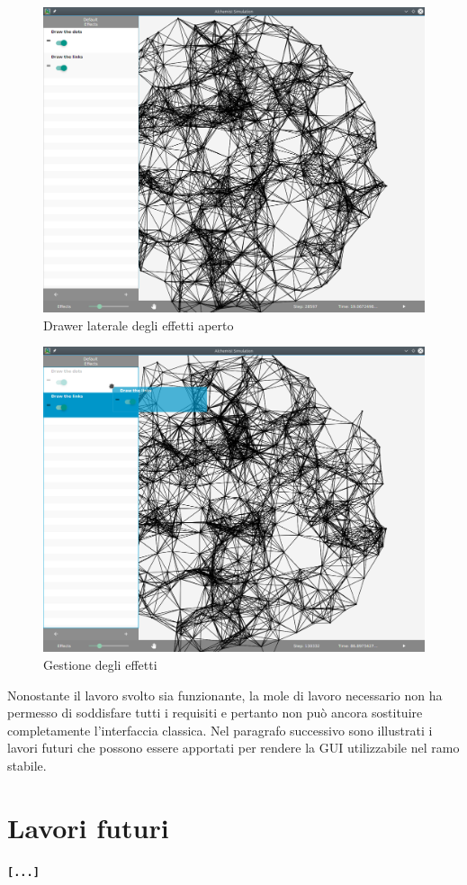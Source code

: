         \begin{figure}[htbp]
            \centering
            \includegraphics[scale=0.45]{img/withNodes/simWithEff}
            \caption{Drawer laterale degli effetti aperto}
            \label{fig:simWithEff}
        \end{figure}

        \begin{figure}[htbp]
            \centering
            \includegraphics[scale=0.45]{img/withNodes/simWithDnD}
            \caption{Gestione  degli effetti}
            \label{fig:simWithDnD}
        \end{figure}

        Nonostante il lavoro svolto sia funzionante, la mole di lavoro necessario non ha permesso di soddisfare tutti i requisiti e pertanto non può ancora sostituire completamente l'interfaccia classica.
        Nel paragrafo successivo sono illustrati i lavori futuri che possono essere apportati per rendere la GUI utilizzabile nel ramo stabile.

    \section{Lavori futuri}\label{sec:futuro}
        \textbf{\texttt{[...]}}
